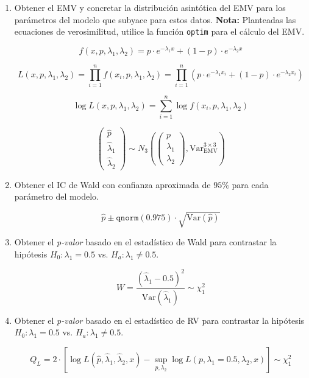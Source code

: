\begin{enumerate}
    \item Obtener el EMV y concretar la distribución asintótica del EMV para los parámetros del modelo que subyace para estos datos.  
    \textbf{Nota:} Planteadas las ecuaciones de verosimilitud, utilice la función \texttt{optim} para el cálculo del EMV.

    \[
    f(x, p, \lambda_1, \lambda_2) = p \cdot e^{-\lambda_1 x} + (1-p) \cdot e^{-\lambda_2 x}
    \]

    \[
    L(x, p, \lambda_1, \lambda_2) = \prod_{i=1}^{n} f(x_i, p, \lambda_1, \lambda_2) = \prod_{i=1}^{n} \left( p \cdot e^{-\lambda_1 x_i} + (1-p) \cdot e^{-\lambda_2 x_i} \right)
    \]

    \[
    \log L(x, p, \lambda_1, \lambda_2) = \sum_{i=1}^{n} \log f(x_i, p, \lambda_1, \lambda_2)
    \]

    \[
    \begin{pmatrix}
        \widehat{p} \\
        \widehat{\lambda}_1 \\
        \widehat{\lambda}_2
    \end{pmatrix}
    \sim
    N_3
    \left(
    \begin{pmatrix}
        p \\
        \lambda_1 \\
        \lambda_2
    \end{pmatrix},
    \text{Var}_{\text{EMV}}^{3 \times 3}
    \right)
    \]

    \item Obtener el IC de Wald con confianza aproximada de \(95\%\) para cada parámetro del modelo.

    \[
    \widehat{p} \pm \texttt{qnorm}(0.975) \cdot \sqrt{\text{Var}(\widehat{p})}
    \]

    \item Obtener el \textit{p-valor} basado en el estadístico de Wald para contrastar la hipótesis \(H_0: \lambda_1 = 0.5\) vs. \(H_a: \lambda_1 \neq 0.5\).

    \[
    W = \frac{(\widehat{\lambda}_1 - 0.5)^2}{\text{Var}(\widehat{\lambda}_1)} \sim \chi^2_1
    \]

    \item Obtener el \textit{p-valor} basado en el estadístico de RV para contrastar la hipótesis \(H_0: \lambda_1 = 0.5\) vs. \(H_a: \lambda_1 \neq 0.5\).

    \[
    Q_L = 2 \cdot \left[ \log L(\widehat{p}, \widehat{\lambda}_1, \widehat{\lambda}_2, x) - \sup_{p, \lambda_2} \log L(p, \lambda_1 = 0.5, \lambda_2, x) \right] \sim \chi^2_1
    \]

\end{enumerate}

